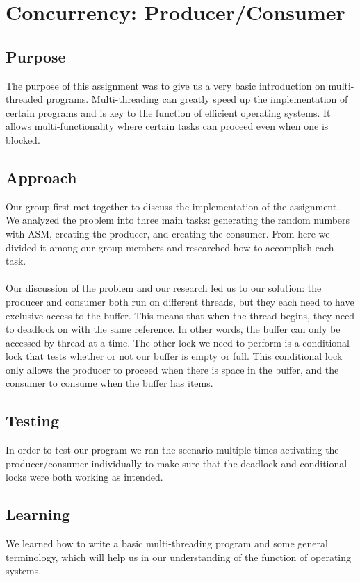 \documentclass[letterpaper, 10pt, notitlepage]{article}
\begin{document}
\section{Concurrency: Producer/Consumer}

\subsection{Purpose}
The purpose of this assignment was to give us a very basic introduction on multi-threaded programs. Multi-threading can greatly speed up the implementation of certain programs and is key to the function of efficient operating systems. It allows multi-functionality where certain tasks can proceed even when one is blocked.

\subsection{Approach}
Our group first met together to discuss the implementation of the assignment. We analyzed the problem into three main tasks: generating the random numbers with ASM, creating the producer, and creating the consumer. From here we divided it among our group members and researched how to accomplish each task.
\\ \\
Our discussion of the problem and our research led us to our solution: the producer and consumer both run on different threads, but they each need to have exclusive access to the buffer. This means that when the thread begins, they need to deadlock on with the same reference. In other words, the buffer can only be accessed by thread at a time. The other lock we need to perform is a conditional lock that tests whether or not our buffer is empty or full. This conditional lock only allows the producer to proceed when there is space in the buffer, and the consumer to consume when the buffer has items.

\subsection{Testing}
In order to test our program we ran the scenario multiple times activating the producer/consumer individually to make sure that the deadlock and conditional locks were both working as intended.

\subsection{Learning}
We learned how to write a basic multi-threading program and some general terminology, which will help us in our understanding of the function of operating systems.
\end{document}
